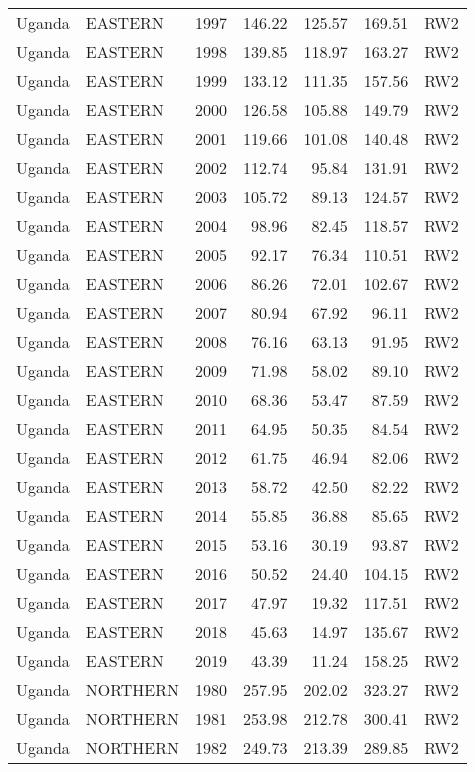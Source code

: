\begin{longtable}{lllrrrl}
  Uganda & EASTERN & 1997 & 146.22 & 125.57 & 169.51 & RW2 \\ 
  Uganda & EASTERN & 1998 & 139.85 & 118.97 & 163.27 & RW2 \\ 
  Uganda & EASTERN & 1999 & 133.12 & 111.35 & 157.56 & RW2 \\ 
  Uganda & EASTERN & 2000 & 126.58 & 105.88 & 149.79 & RW2 \\ 
  Uganda & EASTERN & 2001 & 119.66 & 101.08 & 140.48 & RW2 \\ 
  Uganda & EASTERN & 2002 & 112.74 & 95.84 & 131.91 & RW2 \\ 
  Uganda & EASTERN & 2003 & 105.72 & 89.13 & 124.57 & RW2 \\ 
  Uganda & EASTERN & 2004 & 98.96 & 82.45 & 118.57 & RW2 \\ 
  Uganda & EASTERN & 2005 & 92.17 & 76.34 & 110.51 & RW2 \\ 
  Uganda & EASTERN & 2006 & 86.26 & 72.01 & 102.67 & RW2 \\ 
  Uganda & EASTERN & 2007 & 80.94 & 67.92 & 96.11 & RW2 \\ 
  Uganda & EASTERN & 2008 & 76.16 & 63.13 & 91.95 & RW2 \\ 
  Uganda & EASTERN & 2009 & 71.98 & 58.02 & 89.10 & RW2 \\ 
  Uganda & EASTERN & 2010 & 68.36 & 53.47 & 87.59 & RW2 \\ 
  Uganda & EASTERN & 2011 & 64.95 & 50.35 & 84.54 & RW2 \\ 
  Uganda & EASTERN & 2012 & 61.75 & 46.94 & 82.06 & RW2 \\ 
  Uganda & EASTERN & 2013 & 58.72 & 42.50 & 82.22 & RW2 \\ 
  Uganda & EASTERN & 2014 & 55.85 & 36.88 & 85.65 & RW2 \\ 
  Uganda & EASTERN & 2015 & 53.16 & 30.19 & 93.87 & RW2 \\ 
  Uganda & EASTERN & 2016 & 50.52 & 24.40 & 104.15 & RW2 \\ 
  Uganda & EASTERN & 2017 & 47.97 & 19.32 & 117.51 & RW2 \\ 
  Uganda & EASTERN & 2018 & 45.63 & 14.97 & 135.67 & RW2 \\ 
  Uganda & EASTERN & 2019 & 43.39 & 11.24 & 158.25 & RW2 \\ 
  Uganda & NORTHERN & 1980 & 257.95 & 202.02 & 323.27 & RW2 \\ 
  Uganda & NORTHERN & 1981 & 253.98 & 212.78 & 300.41 & RW2 \\ 
  Uganda & NORTHERN & 1982 & 249.73 & 213.39 & 289.85 & RW2 \\ 

\end{longtable}
